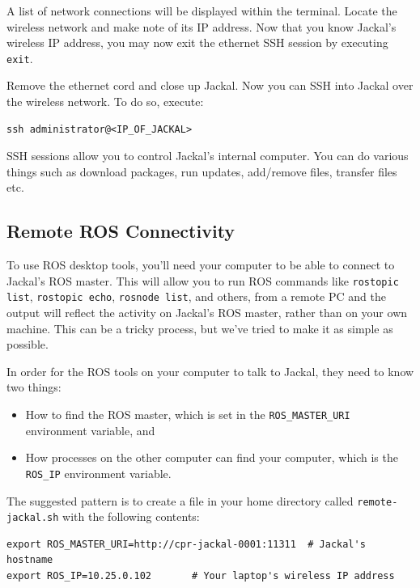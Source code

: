 \documentclass[]{clearpath-latex/clearpath-manual}
\begin{document}
A list of network connections will be displayed within the terminal.  Locate the wireless network and make note of its IP address. Now that you know Jackal's wireless IP address, you may now exit the ethernet SSH session by executing \lstinline{exit}.

Remove the ethernet cord and close up Jackal.   Now you can SSH into Jackal over the wireless network.  To do so, execute:

\begin{lstlisting}
ssh administrator@<IP_OF_JACKAL>
\end{lstlisting}

SSH sessions allow you to control Jackal's internal computer.  You can do various things such as download packages, run updates, add/remove files, transfer files etc.

\subsection{Remote ROS Connectivity}\label{remote}

To use ROS desktop tools, you’ll need your computer to be able to connect to Jackal’s ROS master. This will allow you to run ROS commands like \lstinline{rostopic list}, \lstinline{rostopic echo}, \lstinline{rosnode list}, and others, from a remote PC and the output will reflect the activity on Jackal’s ROS master, rather than on your own machine.  This can be a tricky process, but we’ve tried to make it as simple as possible.

In order for the ROS tools on your computer to talk to Jackal, they need to know two things:

\begin{itemize}[nolistsep]
  \item How to find the ROS master, which is set in the \lstinline{ROS_MASTER_URI} environment variable, and
  \item How processes on the other computer can find your computer, which is the \lstinline{ROS_IP} environment variable.
\end{itemize}

The suggested pattern is to create a file in your home directory called \lstinline{remote-jackal.sh} with the following contents:

\begin{lstlisting}
export ROS_MASTER_URI=http://cpr-jackal-0001:11311  # Jackal's hostname
export ROS_IP=10.25.0.102       # Your laptop's wireless IP address
\end{lstlisting}
\end{document}
